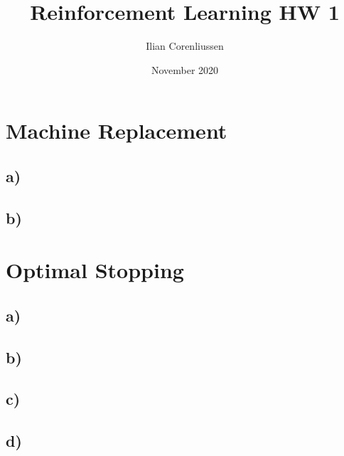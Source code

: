 \documentclass{article}
\title{Reinforcement Learning HW 1}
\author{Ilian Corenliussen}
\date{November 2020}
\begin{document}
\maketitle

\section{Machine Replacement}
\subsection*{a)}
\subsection*{b)}


\section{Optimal Stopping}
\subsection*{a)}
\subsection*{b)}
\subsection*{c)}
\subsection*{d)}
\end{document}
